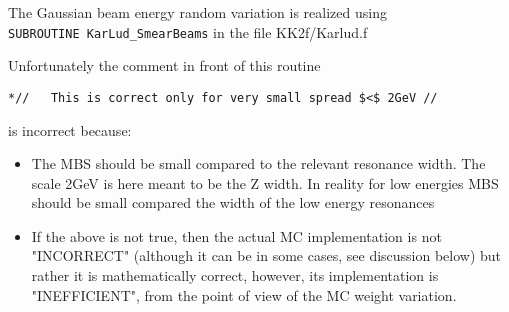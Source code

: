 \documentclass[dvips]{seminar}                      %
\begin{document}
\begin{slide}

The Gaussian beam energy random variation is realized using\\
{\tt SUBROUTINE KarLud\_SmearBeams}
in the file KK2f/Karlud.f

Unfortunately the comment in front of this routine
{\footnotesize
\begin{verbatim}
*//   This is correct only for very small spread $<$ 2GeV //
\end{verbatim}}
is incorrect because:
\begin{itemize}
\item
  The MBS should be small compared to the relevant resonance width.
  The scale 2GeV is here meant to be the Z width. In reality
  for low energies MBS should be small compared the width of the low energy resonances
\item
  If the above is not true, then the actual MC implementation is not "INCORRECT"
  (although it can be in some cases, see discussion below)
  but rather it is mathematically correct, however,
  its implementation is "INEFFICIENT", from the point of view of the MC weight variation.
\end{itemize}
\vfill
\end{slide}    %
\end{document}
